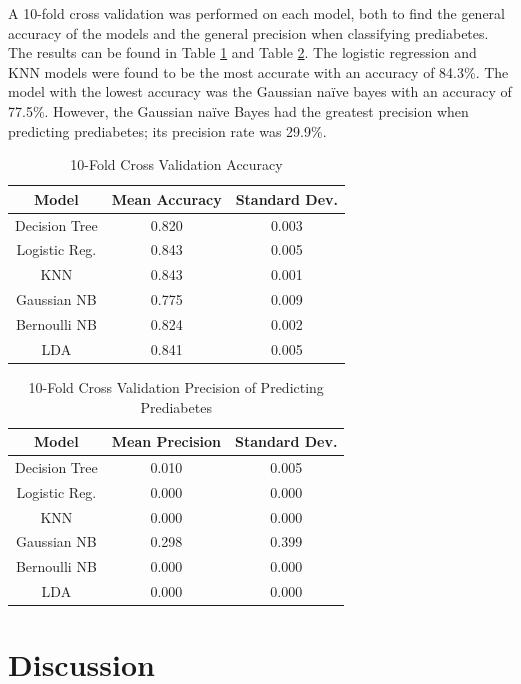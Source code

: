 \documentclass[journal]{IEEEtran}
\begin{document}
A 10-fold cross validation was performed on each model, both to find the general accuracy of the models and the general precision when classifying prediabetes. The results can be found in Table \ref{table:cross-val} and Table \ref{table:prec-cross-val}. The logistic regression and KNN models were found to be the most accurate with an accuracy of 84.3\%. The model with the lowest accuracy was the Gaussian naïve bayes with an accuracy of 77.5\%. However, the Gaussian naïve Bayes had the greatest precision when predicting prediabetes; its precision rate was 29.9\%. 

\begin{table}[h!]
    \centering
    \begin{tabular}{c | c c }
        Model & Mean Accuracy & Standard Dev. \\
        \hline
        Decision Tree &	0.820 &	0.003 \\
        Logistic Reg. &	0.843 &	0.005 \\
        KNN &	0.843 &	0.001 \\
        Gaussian NB &	0.775 &	0.009 \\
        Bernoulli NB &	0.824 &	0.002 \\
        LDA &	0.841 &	0.005 \\
    \end{tabular}
    \caption{10-Fold Cross Validation Accuracy}
    \label{table:cross-val}
\end{table}

\begin{table}[h!]
    \centering
    \begin{tabular}{c | c c }
        Model & Mean Precision & Standard Dev. \\
        \hline
        Decision Tree &	0.010 &	0.005 \\
        Logistic Reg. & 	0.000 &	0.000 \\
        KNN & 	0.000 &	0.000 \\
        Gaussian NB & 	0.298 &	0.399 \\
        Bernoulli NB & 	0.000 &	0.000 \\
        LDA	 & 0.000 &	0.000 \\
    \end{tabular}
    \caption{10-Fold Cross Validation Precision of Predicting Prediabetes}
    \label{table:prec-cross-val}
\end{table}

\section{Discussion}
\label{sec:discussion}
\end{document}
